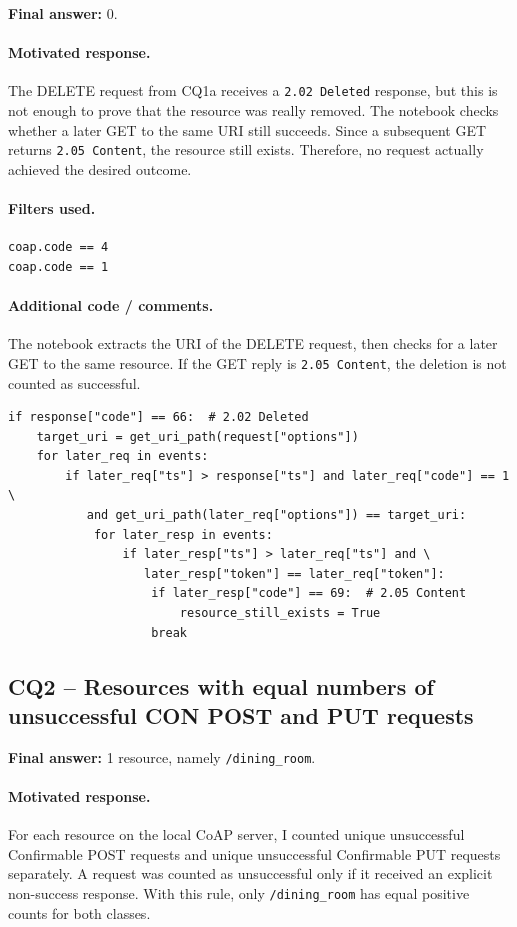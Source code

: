 \documentclass[11pt,a4paper]{article}
\begin{document}
\textbf{Final answer:} 0.

\paragraph{Motivated response.}
The DELETE request from CQ1a receives a \texttt{2.02 Deleted} response, but this is not enough
to prove that the resource was really removed. The notebook checks whether a later GET to the
same URI still succeeds. Since a subsequent GET returns \texttt{2.05 Content}, the resource
still exists. Therefore, no request actually achieved the desired outcome.

\paragraph{Filters used.}
\begin{verbatim}
coap.code == 4
coap.code == 1
\end{verbatim}

\paragraph{Additional code / comments.}
The notebook extracts the URI of the DELETE request, then checks for a later GET to the same
resource. If the GET reply is \texttt{2.05 Content}, the deletion is not counted as successful.

\begin{verbatim}
if response["code"] == 66:  # 2.02 Deleted
    target_uri = get_uri_path(request["options"])
    for later_req in events:
        if later_req["ts"] > response["ts"] and later_req["code"] == 1 \
           and get_uri_path(later_req["options"]) == target_uri:
            for later_resp in events:
                if later_resp["ts"] > later_req["ts"] and \
                   later_resp["token"] == later_req["token"]:
                    if later_resp["code"] == 69:  # 2.05 Content
                        resource_still_exists = True
                    break
\end{verbatim}
\subsection*{CQ2 -- Resources with equal numbers of unsuccessful CON POST and PUT requests}

\textbf{Final answer:} 1 resource, namely \texttt{/dining\_room}.

\paragraph{Motivated response.}
For each resource on the local CoAP server, I counted unique unsuccessful Confirmable POST
requests and unique unsuccessful Confirmable PUT requests separately. A request was counted
as unsuccessful only if it received an explicit non-success response. With this rule, only
\texttt{/dining\_room} has equal positive counts for both classes.
\end{document}
